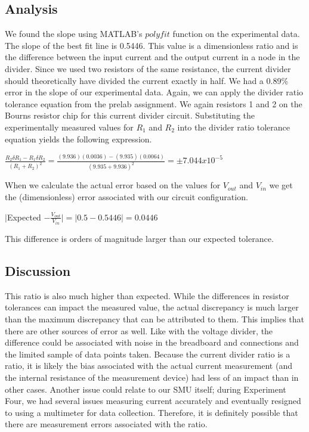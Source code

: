 \documentclass{article}
\begin{document}
\subsection{Analysis}
We found the slope using MATLAB's $polyfit$ function on the experimental data.  The slope of the best fit line is 0.5446.
This value is a dimensionless ratio and is the difference between the input current and the output current in a node in the divider. 
\newline
Since we used two resistors of the same resistance, the current divider should theoretically have divided the current exactly in half. We had a 0.89\% error in the slope of our experimental data.
\newline
Again, we can apply the divider ratio tolerance equation from the prelab assignment. We again resistors 1 and 2 on the Bourns resistor chip for this current divider circuit. Substituting the experimentally measured values for $R_1$ and $R_2$ into the divider ratio tolerance equation yields the following expression.

\begin{center}
    $\frac{R_2 \delta R_1 - R_1 \delta R_2}{(R_1 + R_2)^2} = \frac{(9.936)(0.0036) - (9.935) (0.0064)}{(9.935 + 9.936)^2} = \pm 7.044 x 10^{-5}$ 
\end{center}

When we calculate the actual error based on the values for $V_{out}$ and $V_{in}$ we get the (dimensionless) error associated with our circuit configuration. 

\begin{center}
    $|$Expected $- \frac{V_{out}}{V_{in}}| = |0.5 - 0.5446| = 0.0446$
\end{center}
This difference is orders of magnitude larger than our expected tolerance. 

\subsection{Discussion}
This ratio is also much higher than expected. While the differences in resistor tolerances can impact the measured value, the actual discrepancy is much larger than the maximum discrepancy that can be attributed to them. This implies that there are other sources of error as well. Like with the voltage divider, the difference could be associated with noise in the breadboard and connections and the limited sample of data points taken. Because the current divider ratio is a ratio, it is likely the bias associated with the actual current measurement (and the internal resistance of the measurement device) had less of an impact than in other cases. 
\newline
Another issue could relate to our SMU itself; during Experiment Four, we had several issues measuring current accurately and eventually resigned to using a multimeter for data collection. Therefore, it is definitely possible that there are measurement errors associated with the ratio. 
\end{document}
